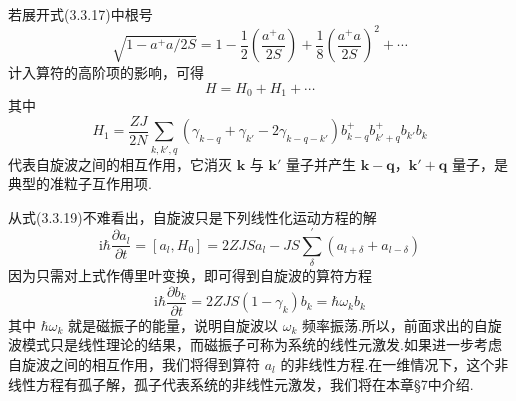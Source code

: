 若展开式(3.3.17)中根号
\begin{equation}
  \sqrt{1-a^{+}a/2S}=1-\frac{1}{2}\left(\frac{a^{+}a}{2S}\right)+\frac{1}{8}\left(\frac{a^{+}a}{2S}\right)^2+\cdots
\end{equation}
计入算符的高阶项的影响，可得
\begin{equation}
  H=H_0+H_1+\cdots
\end{equation}
其中
\begin{equation}
  H_1=\frac{ZJ}{2N}\sum_{k,k',q}\left(\gamma_{k-q}+\gamma_{k'}-2\gamma_{k-q-k'}\right)
  b_{k-q}^{+}b_{k'+q}^{+}b_{k'}b_k
\end{equation}
代表自旋波之间的相互作用，它消灭 $\boldsymbol{k}$ 与 $\boldsymbol{k}'$ 量子并产生
$\boldsymbol{k}-\boldsymbol{q}$，$\boldsymbol{k}'+\boldsymbol{q}$ 量子，是典型的准粒子互作用项.

从式(3.3.19)不难看出，自旋波只是下列线性化运动方程的解
\begin{equation}
  \mathrm{i}\hbar\frac{\partial a_l}{\partial t}=\left[a_l,H_0\right]
  =2ZJSa_l-JS\sum_{\delta}^{\prime}\left(a_{l+\delta}+a_{l-\delta}\right)
\end{equation}
因为只需对上式作傅里叶变换，即可得到自旋波的算符方程
\begin{equation}
  \mathrm{i}\hbar\frac{\partial b_k}{\partial t}=2ZJS\left(1-\gamma_k\right)b_k=\hbar\omega_kb_k
\end{equation}
其中 $\hbar\omega_k$ 就是磁振子的能量，说明自旋波以 $\omega_k$
频率振荡.所以，前面求出的自旋波模式只是线性理论的结果，而磁振子可称为系统的线性元激发.如果进一步考虑自旋波之间的相互作用，我们将得到算符
$a_l$
的非线性方程.在一维情况下，这个非线性方程有孤子解，孤子代表系统的非线性元激发，我们将在本章§7中介绍.

